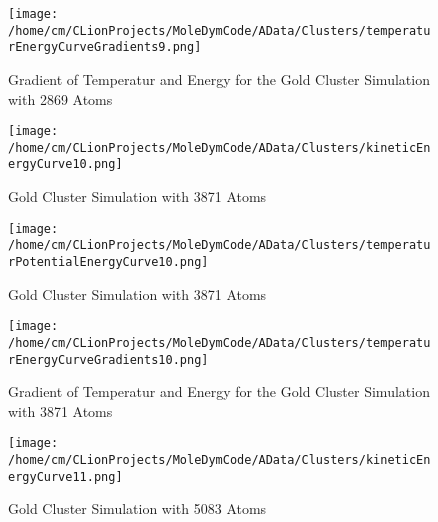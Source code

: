 \begin{figure}[!h] 
    \begin{center} 
        \texttt{[image: /home/cm/CLionProjects/MoleDymCode/AData/Clusters/temperaturEnergyCurveGradients9.png]} 
    \end{center} 
    \caption[Gradient of Temperatur and Energy for the Gold Cluster Simulation with 2869 Atoms]{Gradient of Temperatur and Energy for the Gold Cluster Simulation with 2869 Atoms} 
    \label{GoldClusterSimulationGradient2869} 
\end{figure} 
 
\begin{figure}[!h] 
    \begin{center} 
        \texttt{[image: /home/cm/CLionProjects/MoleDymCode/AData/Clusters/kineticEnergyCurve10.png]} 
    \end{center} 
    \caption[Gold Cluster Simulation with 3871 Atoms]{Gold Cluster Simulation with 3871 Atoms} 
    \label{GoldClusterSimulationKineticTime3871} 
\end{figure} 
 
\begin{figure}[!h] 
    \begin{center} 
        \texttt{[image: /home/cm/CLionProjects/MoleDymCode/AData/Clusters/temperaturPotentialEnergyCurve10.png]} 
    \end{center} 
    \caption[Gold Cluster Simulation with 3871 Atoms]{Gold Cluster Simulation with 3871 Atoms} 
    \label{GoldClusterSimulationTemperaturEnergy3871} 
\end{figure} 
 
\begin{figure}[!h] 
    \begin{center} 
        \texttt{[image: /home/cm/CLionProjects/MoleDymCode/AData/Clusters/temperaturEnergyCurveGradients10.png]} 
    \end{center} 
    \caption[Gradient of Temperatur and Energy for the Gold Cluster Simulation with 3871 Atoms]{Gradient of Temperatur and Energy for the Gold Cluster Simulation with 3871 Atoms} 
    \label{GoldClusterSimulationGradient3871} 
\end{figure} 
 
\begin{figure}[!h] 
    \begin{center} 
        \texttt{[image: /home/cm/CLionProjects/MoleDymCode/AData/Clusters/kineticEnergyCurve11.png]} 
    \end{center} 
    \caption[Gold Cluster Simulation with 5083 Atoms]{Gold Cluster Simulation with 5083 Atoms} 
    \label{GoldClusterSimulationKineticTime5083} 
\end{figure} 
 
